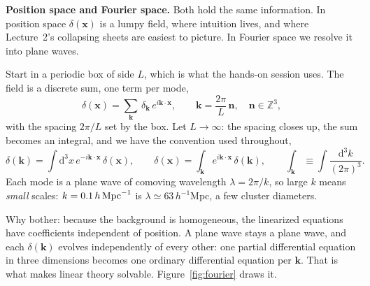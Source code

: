 \documentclass[a4paper,11pt]{article}
\newcommand{\vx}{\bm{x}}
\newcommand{\vk}{\bm{k}}
\newcommand{\dd}{\mathrm{d}}
\numberwithin{equation}{section}
\begin{document}
\medskip
\noindent\textbf{Position space and Fourier space.} Both hold the same
information. In position space $\delta(\vx)$ is a lumpy field, where intuition lives, and where Lecture~2's collapsing sheets are easiest to picture.
In Fourier space we resolve it into plane waves.

Start in a periodic box of side $L$, which is what the hands-on session uses.
The field is a discrete sum, one term per mode,
\begin{equation*}
\delta(\vx) = \sum_{\vk}\,\delta_{\vk}\,e^{i\vk\cdot\vx} ,
\qquad
\vk = \frac{2\pi}{L}\,\bm{n} , \quad \bm{n} \in \mathbb{Z}^3 ,
\end{equation*}
with the spacing $2\pi/L$ set by the box. Let $L \to \infty$: the spacing closes
up, the sum becomes an integral, and we have the convention used throughout,
\begin{equation*}
\delta(\vk) = \int \dd^3x\, e^{-i\vk\cdot\vx}\,\delta(\vx),
\qquad
\delta(\vx) = \int_{\vk} e^{i\vk\cdot\vx}\,\delta(\vk),
\qquad
\int_{\vk} \equiv \int\!\frac{\dd^3k}{(2\pi)^3} .
\end{equation*}
Each mode is a plane wave of comoving wavelength $\lambda = 2\pi/k$, so large
$k$ means \emph{small} scales: $k = 0.1\,h\,{\rm Mpc}^{-1}$ is
$\lambda \simeq 63\,h^{-1}$Mpc, a few cluster diameters.

Why bother: because the background is homogeneous, the linearized equations have
coefficients independent of position. A plane wave stays a plane wave, and each
$\delta(\vk)$ evolves independently of every other: one partial differential
equation in three dimensions becomes one ordinary differential equation per
$\vk$. That is what makes linear theory solvable.
Figure~\ref{fig:fourier} draws it.
\end{document}
